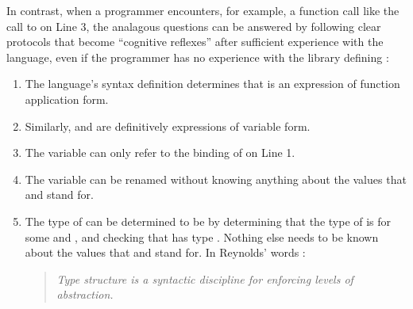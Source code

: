 In contrast, when a programmer encounters, for example, a function call like the call to  on Line 3, the analagous questions can be answered by following clear protocols that become ``cognitive reflexes'' after sufficient experience with the language, even if the programmer has no experience with the library defining :
\begin{enumerate}
\item The language's syntax definition determines that  is an expression of function application form.
\item Similarly,  and  are definitively expressions of variable form.
\item The variable  can only refer to the binding of  on Line 1.
\item The variable  can be renamed without knowing anything about the values that  and  stand for.
\item The type of  can be determined to be  by determining that the type of  is  for some  and , and checking that  has type . Nothing else needs to be known about the values that  and  stand for. In Reynolds' words \cite{B304}:
\begin{quote}
\emph{Type structure is a syntactic discipline for enforcing levels of abstraction.}
\end{quote}
\end{enumerate}



